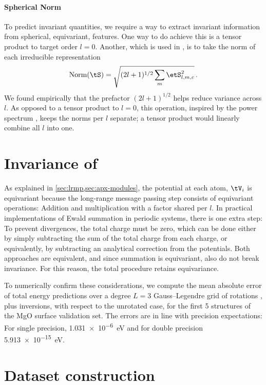\documentclass[10pt]{article}
\newcommand{\rev}[1]{\textcolor{periwinkle}{#1}}
\newcommand{\revs}[1]{}
\begin{document}
\paragraph{Spherical Norm} To predict invariant quantities, we require a way to extract invariant information from spherical, equivariant, features. One way to do achieve this is a tensor product to target order $l=0$. Another, which is used in \lorem, is to take the norm of each irreducible representation
\begin{equation}
    \text{Norm}(\tS) = \sqrt{(2l+1)^{1/2} \sum_m \etS_{l,m,c}^2 } \, .
\end{equation}
We found empirically that the prefactor $(2l+1)^{1/2}$ helps reduce variance across $l$.
As opposed to a tensor product to $l=0$, this operation, inspired by the power spectrum \citep{bkc2013}, keeps the norms per $l$ separate; a tensor product would linearly combine all $l$ into one.


\section{Invariance of \lorem}
\label{sec:ap_equiv}

As explained in \cref{sec:lrmp,sec:apx-modules}, the potential at each atom, $\tV_i$ is equivariant because the long-range message passing step consists of equivariant operations: Addition and multiplication with a factor shared per $l$. In practical implementations of Ewald summation in periodic systems, there is one extra step: To prevent divergences, the total charge must be zero, which can be done either by simply subtracting the sum of the total charge from each charge, or equivalently, by subtracting an analytical correction from the potentials. Both approaches are equivalent, and since summation is equivariant, also do not break invariance. For this reason, the total procedure retains equivariance.

To numerically confirm these considerations, we compute the mean absolute error of \rev{total} energy predictions over a degree $L=3$ \revs{Lebedev}\rev{Gauss--Legendre} grid of rotations \citep{dapbc2026pre}, plus inversions, with respect to the unrotated case, for the first \num{5} structures of the MgO surface validation set. The errors are in line with precision expectations: For single precision, \revs{\qty{1.031e-6}{meV}}\rev{\qty{1.031e-6}{eV}} and for double precision \revs{\qty{5.913e-15}{meV}}\rev{\qty{5.913e-15}{eV}}.


\section{Dataset construction}
\label{sec:ap_datasets}
\end{document}
